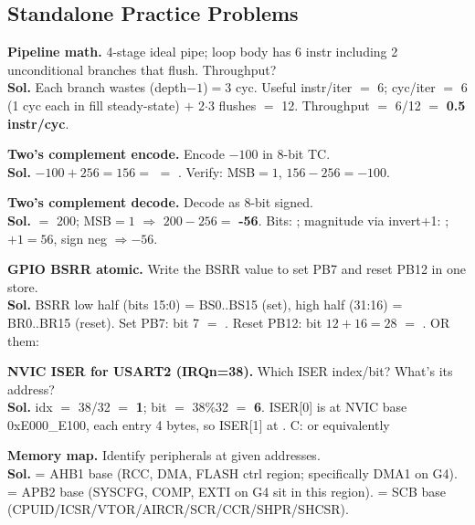 \subsection{Standalone Practice Problems}

\begin{ex}\textbf{Pipeline math.} 4-stage ideal pipe; loop body has 6 instr including 2 unconditional branches that flush. Throughput?\\
\textbf{Sol.} Each branch wastes (depth$-1$)$=$3 cyc. Useful instr/iter $=$ 6; cyc/iter $=$ 6 (1 cyc each in fill steady-state) $+$ 2$\cdot$3 flushes $=$ 12. Throughput $=$ 6/12 $=$ \textbf{0.5 instr/cyc}.\end{ex}

\begin{ex}\textbf{Two's complement encode.} Encode $-100$ in 8-bit TC.\\
\textbf{Sol.} $-100 + 256 = 156 =$  $=$ . Verify: MSB$=1$, $156-256 = -100$. \checkmark
\end{ex}

\begin{ex}\textbf{Two's complement decode.} Decode  as 8-bit signed.\\
\textbf{Sol.}  $=$ 200; MSB$=1$ $\Rightarrow$ $200-256 = $ \textbf{-56}. Bits: ; magnitude via invert+1: ; $+1=56$, sign neg $\Rightarrow -56$. \checkmark
\end{ex}

\begin{ex}\textbf{GPIO BSRR atomic.} Write the BSRR value to set PB7 and reset PB12 in one store.\\
\textbf{Sol.} BSRR low half (bits 15:0) = BS0..BS15 (set), high half (31:16) = BR0..BR15 (reset). Set PB7: bit 7 $=$ . Reset PB12: bit $12+16=28$ $=$ . OR them: \end{ex}

\begin{ex}\textbf{NVIC ISER for USART2 (IRQn=38).} Which ISER index/bit? What's its address?\\
\textbf{Sol.} idx $=$ 38/32 $=$ \textbf{1}; bit $=$ 38\%32 $=$ \textbf{6}. ISER[0] is at NVIC base 0xE000\_E100, each entry 4 bytes, so ISER[1] at . C:  or equivalently \end{ex}

\begin{ex}\textbf{Memory map.} Identify peripherals at given addresses.\\
\textbf{Sol.}  = AHB1 base (RCC, DMA, FLASH ctrl region; specifically DMA1 on G4).  = APB2 base (SYSCFG, COMP, EXTI on G4 sit in this region).  = SCB base (CPUID/ICSR/VTOR/AIRCR/SCR/CCR/SHPR/SHCSR).\end{ex}


